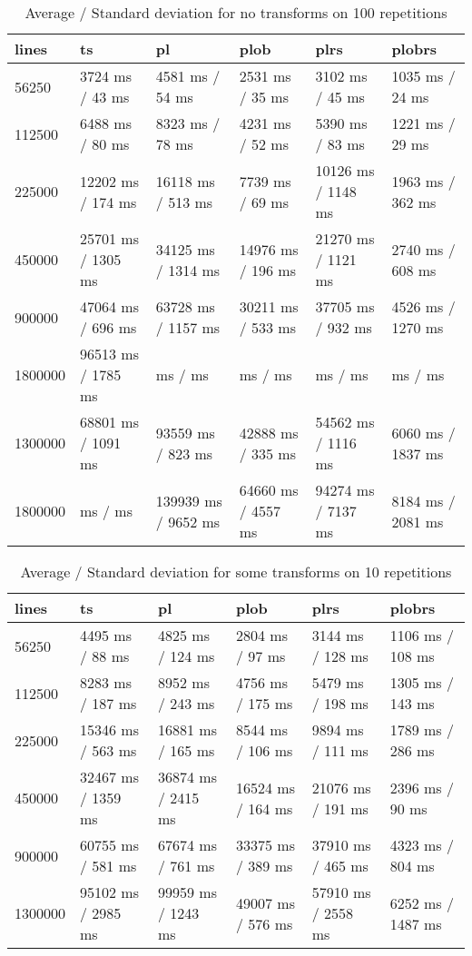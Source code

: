 \begin{table}[ht]
	\caption{Average / Standard deviation for no transforms on 100 repetitions}
	\label{tab:eval:none}
	\begin{tabular}{|l|l|l|l|l|l|}
		\hline
		lines   & ts                 & pl                  & plob               & plrs               & plobrs            \\
		\hline
		56250   & 3724 ms / 43 ms    & 4581 ms / 54 ms     & 2531 ms / 35 ms    & 3102 ms / 45 ms    & 1035 ms / 24 ms   \\
		112500  & 6488 ms / 80 ms    & 8323 ms / 78 ms     & 4231 ms / 52 ms    & 5390 ms / 83 ms    & 1221 ms / 29 ms   \\
		225000  & 12202 ms / 174 ms  & 16118 ms / 513 ms   & 7739 ms / 69 ms    & 10126 ms / 1148 ms & 1963 ms / 362 ms  \\
		450000  & 25701 ms / 1305 ms & 34125 ms / 1314 ms  & 14976 ms / 196 ms  & 21270 ms / 1121 ms & 2740 ms / 608 ms  \\
		900000  & 47064 ms / 696 ms  & 63728 ms / 1157 ms  & 30211 ms / 533 ms  & 37705 ms / 932 ms  & 4526 ms / 1270 ms \\
		1800000 & 96513 ms / 1785 ms & ms /  ms            & ms / ms            & ms / ms            & ms / ms           \\
		\hline
		1300000 & 68801 ms / 1091 ms & 93559 ms / 823 ms   & 42888 ms / 335 ms  & 54562 ms / 1116 ms & 6060 ms / 1837 ms \\
		1800000 & ms /  ms           & 139939 ms / 9652 ms & 64660 ms / 4557 ms & 94274 ms / 7137 ms & 8184 ms / 2081 ms \\
		\hline
	\end{tabular}
\end{table}

\begin{table}[ht]
	\caption{Average / Standard deviation for some transforms on 10 repetitions}
	\label{tab:eval:some}
	\begin{tabular}{|l|l|l|l|l|l|}
		\hline
		lines   & ts                 & pl                 & plob              & plrs               & plobrs            \\
		\hline
		56250   & 4495 ms / 88 ms    & 4825 ms / 124 ms   & 2804 ms / 97 ms   & 3144 ms / 128 ms   & 1106 ms / 108 ms  \\
		112500  & 8283 ms / 187 ms   & 8952 ms / 243 ms   & 4756 ms / 175 ms  & 5479 ms / 198 ms   & 1305 ms / 143 ms  \\
		225000  & 15346 ms / 563 ms  & 16881 ms / 165 ms  & 8544 ms / 106 ms  & 9894 ms / 111 ms   & 1789 ms / 286 ms  \\
		450000  & 32467 ms / 1359 ms & 36874 ms / 2415 ms & 16524 ms / 164 ms & 21076 ms / 191 ms  & 2396 ms / 90 ms   \\
		900000  & 60755 ms / 581 ms  & 67674 ms / 761 ms  & 33375 ms / 389 ms & 37910 ms / 465 ms  & 4323 ms / 804 ms  \\
		1300000 & 95102 ms / 2985 ms & 99959 ms / 1243 ms & 49007 ms / 576 ms & 57910 ms / 2558 ms & 6252 ms / 1487 ms \\
		\hline
	\end{tabular}
\end{table}

